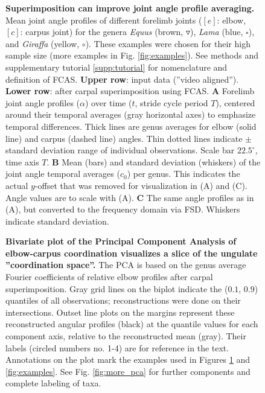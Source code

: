 \begin{figure}[!ht]%
\centering
\caption{\textbf{Superimposition can improve joint angle profile averaging.}
Mean joint angle profiles of different forelimb joints ($[e]$: elbow, $[c]$: carpus joint) for the genera \textit{Equus} (brown, $\triangledown$), \textit{Lama} (blue, $\square$), and \textit{Giraffa} (yellow, $\circ$). These examples were chosen for their high sample size (more examples in Fig. \ref*{fig:examples}). See methods and supplementary tutorial \ref*{supp:tutorial} for nomenclature and definition of FCAS.
\textbf{Upper row}: input data (''video aligned''). \textbf{Lower row}: after carpal superimposition using FCAS.
\textbf{A} Forelimb joint angle profiles ($\alpha$) over time ($t$, stride cycle period $T$), centered around their temporal averages (gray horizontal axes) to emphasize temporal differences. Thick lines are genus averages for elbow (solid line) and carpus (dashed line) angles. Thin dotted lines indicate $\pm$standard deviation range of individual observations. Scale bar $22.5^{\circ}$, time axis $T$.
\textbf{B} Mean (bars) and standard deviation (whiskers) of the joint angle temporal averages ($c_0$) per genus. This indicates the actual $y$-offset that was removed for visualization in (A) and (C). Angle values are to scale with (A).
\textbf{C} The same angle profiles as in (A), but converted to the frequency domain via FSD. Whiskers indicate standard deviation. }
\label{fig:superimposition}
\end{figure}



\begin{figure}[!hb]
\caption{\textbf{Bivariate plot of the Principal Component Analysis of elbow-carpus coordination visualizes a slice of the ungulate ''coordination space''. }
The PCA is based on the genus average Fourier coefficients of relative elbow profiles after carpal superimposition.
Gray grid lines on the biplot indicate the ($0.1$, $0.9$) quantiles of all observations; reconstructions were done on their intersections.
Outset line plots on the margins represent these reconstructed angular profiles (black) at the quantile values for each component axis, relative to the reconstructed mean (gray).
Their labels (circled numbers no. 1-4) are for reference in the text.
Annotations on the plot mark the examples used in Figures \ref{fig:superimposition} and \ref*{fig:examples}.
See Fig. \ref*{fig:more_pca} for further components and complete labeling of taxa.
 }
\label{fig:pca}
\end{figure}



